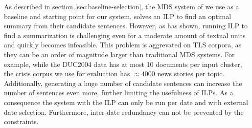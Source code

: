 \documentclass[a4paper,BCOR=10mm]{report}
\numberwithin{lemma}{chapter}
\numberwithin{definition}{chapter}
\begin{document}
%
%
%
%
%
%
%
%
%
%

As described in section \ref{sec:baseline-selection}, the MDS system of \citet{banerjee} we use as a baseline and starting point for our system, solves an ILP to find an optimal summary from their candidate sentences.
However, as \citet{mcdonald} has shown, running ILP to find a summarization is challenging even for a moderate amount of textual units and quickly becomes infeasible.
This problem is aggrevated on TLS corpora, as they can be an order of magnitude larger than traditional MDS systems. For example, while the DUC2004 data has at most 10 documents per input cluster, the crisis corpus we use for evaluation has $\approx 4000$ news stories per topic. Additionally, generating a huge number of candidate sentences can increase the number of sentences even more, further limiting the usefulness of ILPs. As a consequence the system with the ILP can only be run per date and with external date selection. Furthermore, inter-date redundancy can not be prevented by the constraints.
\end{document}
